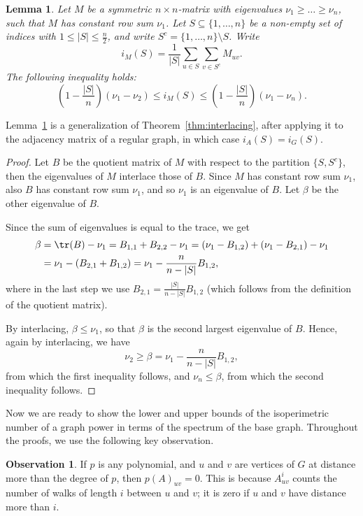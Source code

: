 \documentclass[a4paper,11pt]{article}
\newtheorem{lemma}[theorem]{Lemma}
\theoremstyle{definition}
\newtheorem{observation}[theorem]{Observation}
\begin{document}
\begin{lemma}\label{lemma:interlacing}
    Let $M$ be a symmetric $n\times n$-matrix with eigenvalues $\nu_1\ge \dots \ge \nu_n$, such that $M$ has constant row sum $\nu_1$. Let $S\subseteq \{1,\dots,n\}$ be a non-empty set of indices with $1\le|S|\le \frac n2$, and write $S^c =\{1,\dots,n\} \setminus S$. Write
    $$i_M(S)=\frac 1{|S|}\sum_{u\in S} \sum_{v\in S^c} M_{uv}.$$
    The following inequality holds:
    \[
    \left ( 1-\frac {|S|}{n}\right )(\nu_1-\nu_2) \le i_M(S) \le \left (1 -\frac{|S|}{n}\right ) \left (\nu_1-\nu_n\right ).
    \]
\end{lemma}
Lemma~\ref{lemma:interlacing} is a generalization of Theorem~\ref{thm:interlacing}, after applying it to the adjacency matrix of a regular graph, in which case $i_A(S)=i_G(S)$.
\begin{proof}
    Let $B$ be the quotient matrix of $M$ with respect to the partition $\{S,S^c\}$, then the eigenvalues of $M$ interlace those of $B$. Since $M$ has constant row sum $\nu_1$, also $B$ has constant row sum $\nu_1$, and so $\nu_1$ is an eigenvalue of $B$. Let $\beta$ be the other eigenvalue of $B$.
    
    Since the sum of eigenvalues is equal to the trace, we get
    \begin{align*}
        \beta&=\tr(B)-\nu_1=B_{1,1}+B_{2,2}-\nu_1=(\nu_1-B_{1,2}) + (\nu_1- B_{2,1}) -\nu_1\\
        &=\nu_1-(B_{2,1}+B_{1,2})=\nu_1-\frac n{n-|S|} B_{1,2},
    \end{align*}
    where in the last step we use $B_{2,1}=\frac{|S|}{n-|S|} B_{1,2}$ (which follows from the definition of the quotient matrix).
    
    By interlacing, $\beta\le \nu_1$, so that $\beta$ is the second largest eigenvalue of $B$. Hence, again by interlacing, we have
    $$\nu_2\ge \beta=\nu_1-\frac n{n-|S|} B_{1,2},$$
    from which the first inequality follows, and $\nu_n\le \beta$, from which the second inequality follows.
\end{proof}

Now we are ready to show the lower and upper bounds of the isoperimetric number of a graph power in terms of the spectrum of the base graph. Throughout the proofs, we use the following key observation.
\begin{observation}\label{obs:degree-distance}
    If $p$ is any polynomial, and $u$ and $v$ are vertices of $G$ at distance more than the degree of $p$, then $p(A)_{uv}=0$. This is because $A^i_{uv}$ counts the number of walks of length $i$ between $u$ and $v$; it is zero if $u$ and $v$ have distance more than $i$.
\end{observation}
\end{document}
